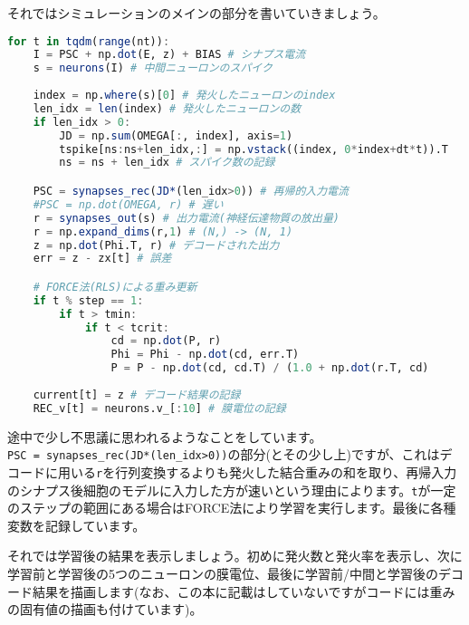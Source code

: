 それではシミュレーションのメインの部分を書いていきましょう。
\begin{lstlisting}[language=julia]
for t in tqdm(range(nt)):
    I = PSC + np.dot(E, z) + BIAS # シナプス電流 
    s = neurons(I) # 中間ニューロンのスパイク
    
    index = np.where(s)[0] # 発火したニューロンのindex
    len_idx = len(index) # 発火したニューロンの数
    if len_idx > 0:
        JD = np.sum(OMEGA[:, index], axis=1)  
        tspike[ns:ns+len_idx,:] = np.vstack((index, 0*index+dt*t)).T
        ns = ns + len_idx # スパイク数の記録

    PSC = synapses_rec(JD*(len_idx>0)) # 再帰的入力電流
    #PSC = np.dot(OMEGA, r) # 遅い
    r = synapses_out(s) # 出力電流(神経伝達物質の放出量)  
    r = np.expand_dims(r,1) # (N,) -> (N, 1)
    z = np.dot(Phi.T, r) # デコードされた出力
    err = z - zx[t] # 誤差

    # FORCE法(RLS)による重み更新
    if t % step == 1:
        if t > tmin:
            if t < tcrit:
                cd = np.dot(P, r)
                Phi = Phi - np.dot(cd, err.T)
                P = P - np.dot(cd, cd.T) / (1.0 + np.dot(r.T, cd)
    
    current[t] = z # デコード結果の記録
    REC_v[t] = neurons.v_[:10] # 膜電位の記録
\end{lstlisting}
途中で少し不思議に思われるようなことをしています。\\
\colorbox{shadecolor}{\texttt{PSC = synapses\_rec(JD*(len\_idx>0))}}の部分(とその少し上)ですが、これはデコードに用いる\texttt{r}を行列変換するよりも発火した結合重みの和を取り、再帰入力のシナプス後細胞のモデルに入力した方が速いという理由によります。\texttt{t}が一定のステップの範囲にある場合はFORCE法により学習を実行します。最後に各種変数を記録しています。\par
それでは学習後の結果を表示しましょう。初めに発火数と発火率を表示し、次に学習前と学習後の5つのニューロンの膜電位、最後に学習前/中間と学習後のデコード結果を描画します(なお、この本に記載はしていないですがコードには重みの固有値の描画も付けています)。
